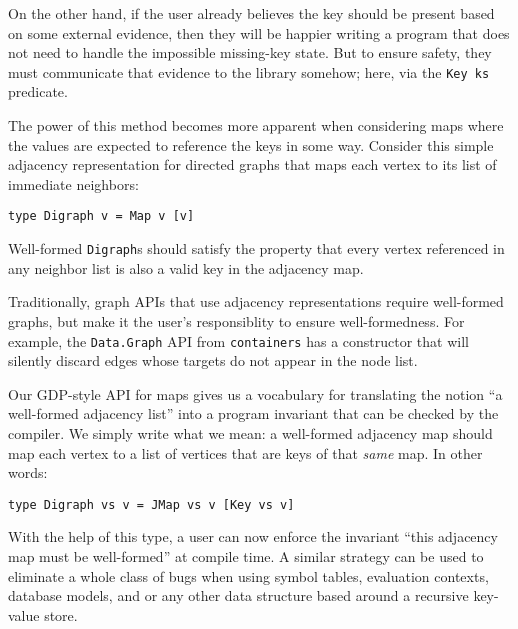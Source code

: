 \documentclass[format=sigplan, review=false, screen=true, 10pt]{acmart}
\makeatletter
\let\origsubsection\subsection
\renewcommand\subsection{\@ifstar{\starsubsection}{\nostarsubsection}}
\newcommand\nostarsubsection[1]
{\subsectionprelude\origsubsection{#1}\subsectionpostlude}
\newcommand\starsubsection[1]
{\subsectionprelude\origsubsection*{#1}\subsectionpostlude}
\newcommand\subsectionprelude{%
  \vspace{-0.25em}
}
\newcommand\subsectionpostlude{%
  \vspace{-0.05em}
}
\makeatother
\begin{document}
On the other hand, if the user already believes the key should be present based on some
external evidence, then they will be happier writing a program that does not need to handle
the impossible missing-key state. But to ensure safety, they must communicate that evidence to the library
somehow; here, via the \texttt{Key ks} predicate.

\subsection{Application: well-formed adjacency lists}

The power of this method becomes more apparent when considering maps where
the values are expected to reference the keys in some way. Consider this
simple adjacency representation for directed graphs that maps each vertex to its list of immediate neighbors:
\begin{verbatim}
type Digraph v = Map v [v]
\end{verbatim}
Well-formed \texttt{Digraph}s
should satisfy the property that every vertex referenced in any neighbor list is also
a valid key in the adjacency map.

Traditionally, graph APIs that use adjacency representations require well-formed
graphs, but make it the user's responsiblity to ensure well-formedness. For example,
the \texttt{Data.Graph} API from \texttt{containers} has a constructor that
will silently discard edges whose targets do not appear in the node list.

Our GDP-style API for maps gives us a vocabulary for
translating the notion ``a well-formed adjacency list'' into a program invariant that can
be checked by the compiler. We simply write what we mean: a well-formed adjacency
map should map each vertex to a list of vertices that are keys of that \emph{same} map.
In other words:
\begin{verbatim}
type Digraph vs v = JMap vs v [Key vs v]
\end{verbatim}
With the help of this type, a user can now enforce the invariant ``this adjacency map
must be well-formed'' at compile time. A similar strategy can be used to eliminate a
whole class of bugs when using symbol tables, evaluation contexts,
database models, and or any other data structure based around a recursive key-value store.
\end{document}
